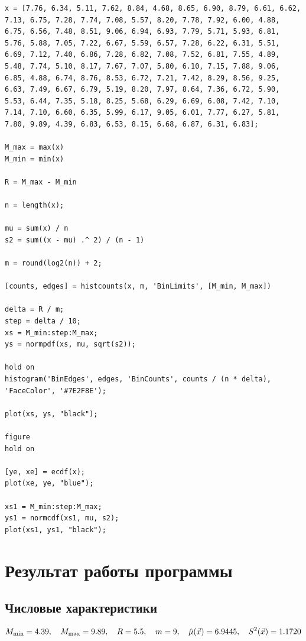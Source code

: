 \begin{lstlisting}
x = [7.76, 6.34, 5.11, 7.62, 8.84, 4.68, 8.65, 6.90, 8.79, 6.61, 6.62, 7.13, 6.75, 7.28, 7.74, 7.08, 5.57, 8.20, 7.78, 7.92, 6.00, 4.88, 6.75, 6.56, 7.48, 8.51, 9.06, 6.94, 6.93, 7.79, 5.71, 5.93, 6.81, 5.76, 5.88, 7.05, 7.22, 6.67, 5.59, 6.57, 7.28, 6.22, 6.31, 5.51, 6.69, 7.12, 7.40, 6.86, 7.28, 6.82, 7.08, 7.52, 6.81, 7.55, 4.89, 5.48, 7.74, 5.10, 8.17, 7.67, 7.07, 5.80, 6.10, 7.15, 7.88, 9.06, 6.85, 4.88, 6.74, 8.76, 8.53, 6.72, 7.21, 7.42, 8.29, 8.56, 9.25, 6.63, 7.49, 6.67, 6.79, 5.19, 8.20, 7.97, 8.64, 7.36, 6.72, 5.90, 5.53, 6.44, 7.35, 5.18, 8.25, 5.68, 6.29, 6.69, 6.08, 7.42, 7.10, 7.14, 7.10, 6.60, 6.35, 5.99, 6.17, 9.05, 6.01, 7.77, 6.27, 5.81, 7.80, 9.89, 4.39, 6.83, 6.53, 8.15, 6.68, 6.87, 6.31, 6.83];

M_max = max(x)
M_min = min(x)

R = M_max - M_min

n = length(x);

mu = sum(x) / n
s2 = sum((x - mu) .^ 2) / (n - 1)

m = round(log2(n)) + 2;

[counts, edges] = histcounts(x, m, 'BinLimits', [M_min, M_max])

delta = R / m;
step = delta / 10;
xs = M_min:step:M_max;
ys = normpdf(xs, mu, sqrt(s2));

hold on
histogram('BinEdges', edges, 'BinCounts', counts / (n * delta), 'FaceColor', '#7E2F8E');

plot(xs, ys, "black");

figure
hold on

[ye, xe] = ecdf(x);
plot(xe, ye, "blue");

xs1 = M_min:step:M_max;
ys1 = normcdf(xs1, mu, s2);
plot(xs1, ys1, "black");
\end{lstlisting}

\section{Результат работы программы}

\subsection{Числовые характеристики}
\begin{equation*}
 M_{\min} = 4.39, \quad M_{\max} = 9.89, \quad R = 5.5, \quad m = 9, \quad \hat\mu(\vec x) = 6.9445, \quad S^2(\vec x) = 1.1720 \\
\end{equation*}

